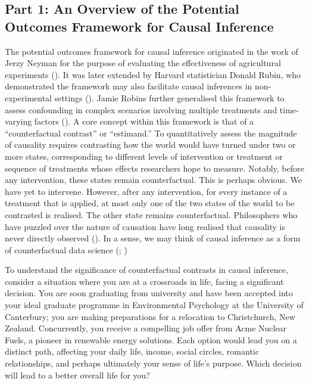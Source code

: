 \documentclass[
  singlecolumn]{article}
\begin{document}
\subsection{Part 1: An Overview of the Potential Outcomes Framework for
Causal
Inference}\label{part-1-an-overview-of-the-potential-outcomes-framework-for-causal-inference}

The potential outcomes framework for causal inference originated in the
work of Jerzy Neyman for the purpose of evaluating the effectiveness of
agricultural experiments (). It
was later extended by Harvard statistician Donald Rubin, who
demonstrated the framework may also facilitate causal inferences in
non-experimental settings (). Jamie
Robins further generalised this framework to assess confounding in
complex scenarios involving multiple treatments and time-varying factors
(). A core concept within this
framework is that of a ``counterfactual contrast'' or ``estimand.'' To
quantitatively assess the magnitude of causality requires contrasting
how the world would have turned under two or more states, corresponding
to different levels of intervention or treatment or sequence of
treatments whose effects researchers hope to measure. Notably, before
any intervention, these states remain counterfactual. This is perhaps
obvious. We have yet to intervene. However, after any intervention, for
every instance of a treatment that is applied, at most only one of the
two states of the world to be contrasted is realised. The other state
remains counterfactual. Philosophers who have puzzled over the nature of
causation have long realised that causality is never directly observed
(). In a sense, we may think of causal
inference as a form of counterfactual data science
(;
)

To understand the significance of counterfactual contrasts in causal
inference, consider a situation where you are at a crossroads in life,
facing a significant decision. You are soon graduating from university
and have been accepted into your ideal graduate programme in
Environmental Psychology at the University of Canterbury; you are making
preparations for a relocation to Christchurch, New Zealand.
Concurrently, you receive a compelling job offer from Acme Nuclear
Fuels, a pioneer in renewable energy solutions. Each option would lead
you on a distinct path, affecting your daily life, income, social
circles, romantic relationships, and perhaps ultimately your sense of
life's purpose. Which decision will lead to a better overall life for
you?
\end{document}
